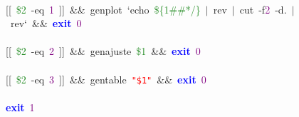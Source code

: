 \mbox{} \\
\mbox{}\textcolor{BrickRed}{[[}\ \textcolor{ForestGreen}{\$2}\ -eq\ \textcolor{Purple}{1}\ \textcolor{BrickRed}{]]}\ \textcolor{BrickRed}{\&\&}\ genplot\ `echo\ \textcolor{ForestGreen}{\$\{1\#\#*/\}}\ \textcolor{BrickRed}{$|$}\ rev\ \textcolor{BrickRed}{$|$}\ cut\ -f\textcolor{Purple}{2}\ -d\textcolor{BrickRed}{.}\ \textcolor{BrickRed}{$|$}\ rev`\ \textcolor{BrickRed}{\&\&}\ \textbf{\textcolor{Blue}{exit}}\ \textcolor{Purple}{0} \\
\mbox{} \\
\mbox{}\textcolor{BrickRed}{[[}\ \textcolor{ForestGreen}{\$2}\ -eq\ \textcolor{Purple}{2}\ \textcolor{BrickRed}{]]}\ \textcolor{BrickRed}{\&\&}\ genajuste\ \textcolor{ForestGreen}{\$1}\ \textcolor{BrickRed}{\&\&}\ \textbf{\textcolor{Blue}{exit}}\ \textcolor{Purple}{0} \\
\mbox{} \\
\mbox{}\textcolor{BrickRed}{[[}\ \textcolor{ForestGreen}{\$2}\ -eq\ \textcolor{Purple}{3}\ \textcolor{BrickRed}{]]}\ \textcolor{BrickRed}{\&\&}\ gentable\ \texttt{\textcolor{Red}{"{}\$1"{}}}\ \textcolor{BrickRed}{\&\&}\ \textbf{\textcolor{Blue}{exit}}\ \textcolor{Purple}{0} \\
\mbox{} \\
\mbox{}\textbf{\textcolor{Blue}{exit}}\ \textcolor{Purple}{1} \\
\mbox{}

